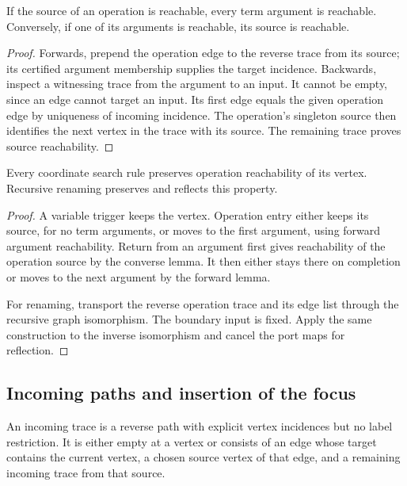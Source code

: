 \begin{lemma}
If the source of an operation is reachable, every term argument is reachable.
Conversely, if one of its arguments is reachable, its source is reachable.
\end{lemma}
\begin{proof}
Forwards, prepend the operation edge to the reverse trace from its source;
its certified argument membership supplies the target incidence. Backwards,
inspect a witnessing trace from the argument to an input. It cannot be empty,
since an edge cannot target an input. Its first edge equals the given
operation edge by uniqueness of incoming incidence. The operation's singleton
source then identifies the next vertex in the trace with its source. The
remaining trace proves source reachability.
\end{proof}

\begin{theorem}
Every coordinate search rule preserves operation reachability of its vertex.
Recursive renaming preserves and reflects this property.
\end{theorem}
\begin{proof}
A variable trigger keeps the vertex. Operation entry either keeps its source,
for no term arguments, or moves to the first argument, using forward argument
reachability. Return from an argument first gives reachability of the operation
source by the converse lemma. It then either stays there on completion or
moves to the next argument by the forward lemma.

For renaming, transport the reverse operation trace and its edge list through
the recursive graph isomorphism. The boundary input is fixed. Apply the same
construction to the inverse isomorphism and cancel the port maps for reflection.
\end{proof}

\subsection{Incoming paths and insertion of the focus}
\begin{definition}
An incoming trace is a reverse path with explicit vertex incidences but no
label restriction. It is either empty at a vertex or consists of an edge
whose target contains the current vertex, a chosen source vertex of that edge,
and a remaining incoming trace from that source.
\end{definition}

